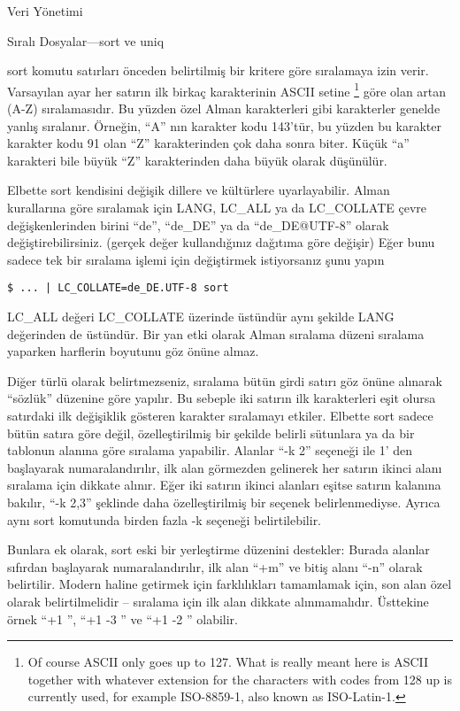 \begin{section}{Veri Yönetimi}
\begin{subsection}{Sıralı Dosyalar—sort ve uniq}

sort komutu satırları önceden belirtilmiş bir kritere göre sıralamaya izin verir. Varsayılan ayar her satırın ilk birkaç karakterinin ASCII setine
\footnote{ Of course ASCII only goes up to 127. What is really meant here is ASCII together with whatever extension for the characters with codes from 128 up is currently used, for example ISO-8859-1, also known as ISO-Latin-1.} göre olan artan (A-Z) sıralamasıdır. Bu yüzden özel Alman karakterleri gibi karakterler genelde yanlış sıralanır. Örneğin, “A” nın karakter kodu 143'tür, bu yüzden bu karakter karakter kodu 91 olan “Z” karakterinden çok daha sonra biter. Küçük “a” karakteri bile büyük “Z” karakterinden daha büyük olarak düşünülür.

Elbette sort kendisini değişik dillere ve kültürlere uyarlayabilir. Alman kurallarına göre sıralamak için LANG, LC\_ALL ya da LC\_COLLATE  çevre değişkenlerinden birini “de”, “de\_DE” ya da “de\_DE@UTF-8” olarak değiştirebilirsiniz. (gerçek değer kullandığınız dağıtıma göre değişir) Eğer bunu sadece tek bir sıralama işlemi için değiştirmek istiyorsanız şunu yapın
\begin{verbatim}
$ ... | LC_COLLATE=de_DE.UTF-8 sort
\end{verbatim}

LC\_ALL değeri LC\_COLLATE üzerinde üstündür aynı şekilde LANG değerinden de üstündür. Bir yan etki olarak Alman sıralama düzeni sıralama yaparken harflerin boyutunu göz önüne almaz.

Diğer türlü olarak belirtmezseniz, sıralama bütün girdi satırı göz önüne alınarak “sözlük” düzenine göre yapılır. Bu sebeple iki satırın ilk karakterleri eşit olursa satırdaki ilk değişiklik gösteren karakter sıralamayı etkiler. Elbette sort sadece bütün satıra göre değil, özelleştirilmiş bir şekilde belirli sütunlara ya da bir tablonun alanına göre sıralama yapabilir. Alanlar “-k 2” seçeneği ile 1' den başlayarak numaralandırılır, ilk alan görmezden gelinerek her satırın ikinci alanı sıralama için dikkate alınır. Eğer iki satırın ikinci alanları eşitse satırın kalanına bakılır, “-k 2,3” şeklinde daha özelleştirilmiş bir seçenek belirlenmediyse. Ayrıca aynı sort komutunda birden fazla -k seçeneği belirtilebilir. 

Bunlara ek olarak, sort eski bir yerleştirme düzenini destekler: Burada alanlar sıfırdan başlayarak numaralandırılır, ilk alan “+m” ve bitiş alanı “-n” olarak belirtilir. Modern haline getirmek için farklılıkları tamamlamak için, son alan özel olarak belirtilmelidir – sıralama için ilk alan dikkate alınmamalıdır. Üsttekine örnek “+1 ”, “+1 -3 ” ve “+1 -2 ” olabilir. 


\end{subsection}
\end{section}
